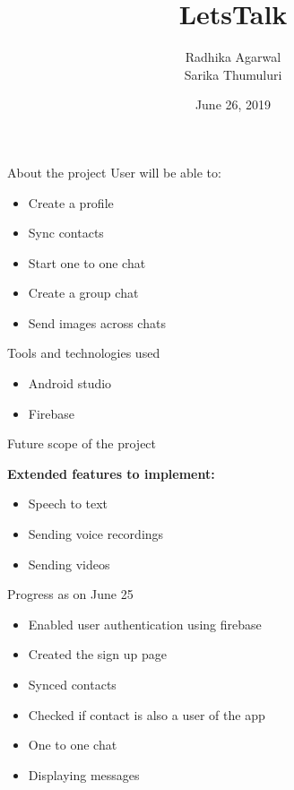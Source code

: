 \documentclass{beamer}
\title{LetsTalk}
\author{Radhika Agarwal\\
 Sarika Thumuluri}
\date{June 26, 2019}
\begin{document}
\frame{\titlepage}
 


\begin{frame}{About the project}
User will be able to:
    \begin{itemize}
        \item Create a profile 
        \pause
        \item Sync contacts
        \pause
        \item Start one to one chat
        \pause
        \item Create a group chat 
        \pause
        \item Send images across chats 
    \end{itemize}

\end{frame}


\begin{frame}{Tools and technologies used}
\begin{itemize}
\item Android studio
\item Firebase
\end{itemize}
\end{frame}


\begin{frame}{Future scope of the project}

\textbf{Extended features to implement:}\newline\pause
\begin{itemize}
\item Speech to text
\pause
\item Sending voice recordings
\pause
\item Sending videos
\end{itemize}
\end{frame}


\begin{frame}{Progress as on June 25}
\begin{itemize}
\item Enabled user authentication using firebase
\item Created the sign up page
\item Synced contacts
\item Checked if contact is also a user of the app
\item One to one chat
\item Displaying messages
\end{itemize}
\end{frame}
\end{document}
